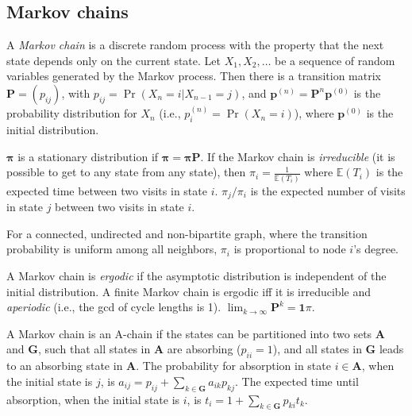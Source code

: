\subsection{Markov chains}
A \emph{Markov chain} is a discrete random process with the property that the next state depends only on the current state.
Let $X_1,X_2,\ldots$ be a sequence of random variables generated by the Markov process.
Then there is a transition matrix $\mathbf{P} = (p_{ij})$, with $p_{ij} = \Pr(X_n = i | X_{n-1} = j)$,
and $\mathbf{p}^{(n)} = \mathbf P^n \mathbf p^{(0)}$ is the probability distribution for $X_n$ (i.e., $p^{(n)}_i = \Pr(X_n = i)$),
where $\mathbf{p}^{(0)}$ is the initial distribution.

$\mathbf{\pi}$ is a stationary distribution if $\mathbf{\pi} = \mathbf{\pi P}$.
If the Markov chain is \emph{irreducible} (it is possible to get to any state from any state),
then $\pi_i = \frac{1}{\mathbb{E}(T_i)}$ where $\mathbb{E}(T_i)$  is the expected time between two visits in state $i$.
$\pi_j/\pi_i$ is the expected number of visits in state $j$ between two visits in state $i$.

For a connected, undirected and non-bipartite graph, where the transition probability is uniform among all neighbors, $\pi_i$ is proportional to node $i$'s degree.

A Markov chain is \emph{ergodic} if the asymptotic distribution is independent of the initial distribution.
A finite Markov chain is ergodic iff it is irreducible and \emph{aperiodic} (i.e., the gcd of cycle lengths is 1).
$\lim_{k\rightarrow\infty}\mathbf{P}^k = \mathbf{1}\pi$.

A Markov chain is an A-chain if the states can be partitioned into two sets $\mathbf{A}$ and $\mathbf{G}$, such that all states in $\mathbf{A}$ are absorbing ($p_{ii}=1$), and all states in $\mathbf{G}$ leads to an absorbing state in $\mathbf{A}$.
The probability for absorption in state $i\in\mathbf{A}$, when the initial state is $j$, is $a_{ij} = p_{ij}+\sum_{k\in\mathbf{G}} a_{ik}p_{kj}$.
The expected time until absorption, when the initial state is $i$, is $t_i = 1+\sum_{k\in\mathbf{G}}p_{ki}t_k$.
